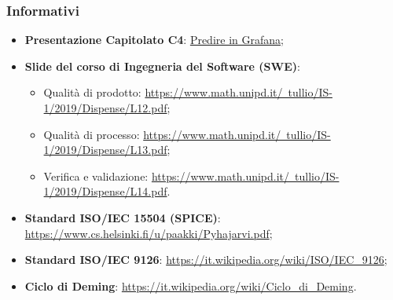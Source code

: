 \documentclass[../piano-di-qualifica.tex]{subfiles}
\begin{document}
\subsubsection{Informativi}%
\label{subs:informativi}
\begin{itemize}
    \item \textbf{Presentazione Capitolato C4}: \href{https://www.math.unipd.it/~tullio/IS-1/2019/Dispense/C4a.pdf}{Predire in Grafana};
    \item \textbf{Slide del corso di Ingegneria del Software (SWE)}:
    \begin{itemize}
        \item Qualità di prodotto: \href{https://www.math.unipd.it/~tullio/IS-1/2019/Dispense/L12.pdf}{https://www.math.unipd.it/~tullio/IS-1/2019/Dispense/L12.pdf};
        \item Qualità di processo: \href{https://www.math.unipd.it/~tullio/IS-1/2019/Dispense/L13.pdf}{https://www.math.unipd.it/~tullio/IS-1/2019/Dispense/L13.pdf};
        \item Verifica e validazione: \href{https://www.math.unipd.it/~tullio/IS-1/2019/Dispense/L14.pdf}{https://www.math.unipd.it/~tullio/IS-1/2019/Dispense/L14.pdf}.
    \end{itemize}
    \item \textbf{Standard ISO/IEC 15504 (SPICE)}: \href{https://www.cs.helsinki.fi/u/paakki/Pyhajarvi.pdf}{https://www.cs.helsinki.fi/u/paakki/Pyhajarvi.pdf};
    \item \textbf{Standard ISO/IEC 9126}: \href{https://it.wikipedia.org/wiki/ISO/IEC\_9126}{https://it.wikipedia.org/wiki/ISO/IEC\_9126};
    \item \textbf{Ciclo di Deming}: \href{https://it.wikipedia.org/wiki/Ciclo\_di\_Deming}{https://it.wikipedia.org/wiki/Ciclo\_di\_Deming}.
\end{itemize}
\end{document}
